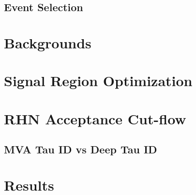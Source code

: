 \documentclass[letterpaper,12pt]{article}
\begin{document}
\subsection{Event Selection}
\label{sec:eventsel}

\section{Backgrounds}
\label{sec:backgrounds}

\section{Signal Region Optimization}
\label{sec:sro}

\section{RHN Acceptance Cut-flow}
\label{sec:cutflow}

\subsection{MVA Tau ID vs Deep Tau ID}
\label{sec:mvadeep}

\section{Results}
\label{sec:results}
\end{document}

